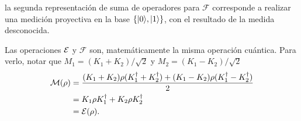 la segunda representación de suma de operadores para $\mathcal{F}$ corresponde a realizar una medición proyectiva en la base $\{|0\rangle , |1\rangle\}$, con el resultado de la medida desconocida. 



Las operaciones $\mathcal{E}$ y $\mathcal{F}$ son, matemáticamente la misma operación cuántica. Para verlo, notar que $M_1=(K_1+K_2)/\sqrt{2}$ y $M_2=(K_1-K_2)/\sqrt{2}$
\begin{equation}
    \begin{split}
        \mathcal{M}(\rho)&=\dfrac{(K_1+K_2)\rho(K_1^\dagger+K_2^\dagger)+(K_1-K_2)\rho(K_1^\dagger-K_2^\dagger)}{2}\\
        &=K_1\rho K_1^\dagger+K_2\rho K_2^\dagger\\
        &=\mathcal{E}(\rho).
    \end{split}
\end{equation}

